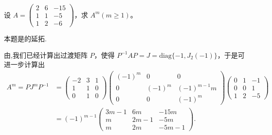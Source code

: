 \documentclass[../../main.tex]{subfiles}%
\begin{document}
\begin{example}
设 $A = \begin{pmatrix}
2 & 6 & -15 \\
1 & 1 & -5 \\
1 & 2 & -6
\end{pmatrix}$，求 $A^m (m \geqslant  1)$。
\end{example}
\begin{remark}
本题是的延拓.
\end{remark}
\begin{solution}
由,我们已经计算出过渡矩阵 $P$，使得 $P^{-1}AP = J = \mathrm{diag}\{-1, J_2(-1)\}$，于是可进一步计算出
\begin{align*}
A^m = PJ^mP^{-1} &= \begin{pmatrix}
-2 & 3 & 1 \\
1 & 1 & 0 \\
0 & 1 & 0
\end{pmatrix}
\begin{pmatrix}
(-1)^m & 0 & 0 \\
0 & (-1)^m & (-1)^{m - 1}m \\
0 & 0 & (-1)^m
\end{pmatrix}
\begin{pmatrix}
0 & 1 & -1 \\
0 & 0 & 1 \\
1 & 2 & -5
\end{pmatrix}\\
&= (-1)^{m - 1}
\begin{pmatrix}
3m - 1 & 6m & -15m \\
m & 2m - 1 & -5m \\
m & 2m & -5m - 1
\end{pmatrix}. 
\end{align*}

\end{solution}
\end{document}
